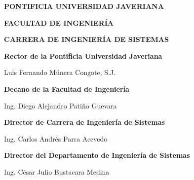 \thispagestyle{fancy}

\begin{center}
    {\large\bfseries PONTIFICIA UNIVERSIDAD JAVERIANA\par}
    {\large\bfseries FACULTAD DE INGENIERÍA\par}
    {\large\bfseries CARRERA DE INGENIERÍA DE SISTEMAS\par}
\end{center}

\vspace{3cm}

\begin{center}
    {\large\bfseries Rector de la Pontificia Universidad Javeriana\par}
    \vspace{0.5cm}
    {\large Luis Fernando Múnera Congote, S.J.\par}

    \vspace{2cm}

    {\large\bfseries Decano de la Facultad de Ingeniería\par}
    \vspace{0.5cm}
    {\large Ing. Diego Alejandro Patiño Guevara\par}

    \vspace{2cm}

    {\large\bfseries Director de Carrera de Ingeniería de Sistemas\par}
    \vspace{0.5cm}
    {\large Ing. Carlos Andrés Parra Acevedo\par}

    \vspace{2cm}

    {\large\bfseries Director del Departamento de Ingeniería de Sistemas\par}
    \vspace{0.5cm}
    {\large Ing. César Julio Bustacara Medina\par}
\end{center}
